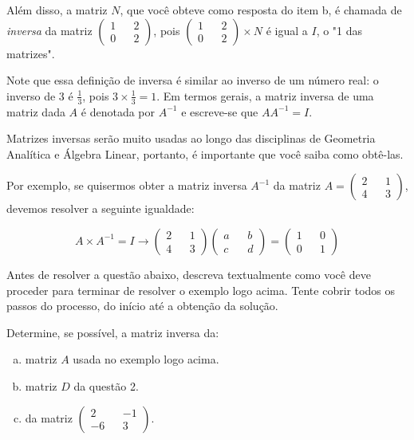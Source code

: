 \documentclass[main_estudante.tex]{subfiles}
\begin{document}
Além disso, a matriz $N$, que você obteve como resposta do item b, é chamada de {\em inversa} da matriz $ \begin{pmatrix} 1 && 2 \\ 0 && 2 \end{pmatrix}$, pois $\begin{pmatrix} 1 && 2 \\ 0 && 2 \end{pmatrix} \times N$ é igual a $I$, o "1 das matrizes".

Note que essa definição de inversa é similar ao inverso de um número real: o inverso de 3 é $\frac{1}{3}$, pois $3 \times \frac{1}{3} = 1$. Em termos gerais, a matriz inversa de uma matriz dada $A$ é denotada por $A^{-1}$ e escreve-se que $AA^{-1}=I$.

Matrizes inversas serão muito usadas ao longo das disciplinas de Geometria Analítica e Álgebra Linear, portanto, é importante que você saiba como obtê-las.

Por exemplo, se quisermos obter a matriz inversa $A^{-1}$ da matriz $A=\begin{pmatrix} 2 && 1 \\ 4 && 3 \end{pmatrix}$, devemos resolver a seguinte igualdade:


\begin{equation*}
 A \times A^{-1}=I \longrightarrow \begin{pmatrix} 2 && 1 \\ 4 && 3 \end{pmatrix} \begin{pmatrix} a && b \\ c && d \end{pmatrix} = \begin{pmatrix} 1 && 0 \\ 0 && 1 \end{pmatrix}
\end{equation*}

\begin{reflita}
Antes de resolver a questão abaixo, descreva textualmente como você deve proceder para terminar de resolver o exemplo logo acima. Tente cobrir todos os passos do processo, do início até a obtenção da solução.
\end{reflita}

\begin{questao}
Determine, se possível, a matriz inversa da:
\begin{enumerate}[a)]
\item matriz $A$ usada no exemplo logo acima.
\item matriz $D$ da questão 2.
\item da matriz $ \begin{pmatrix} 2 && -1 \\ -6 && 3 \end{pmatrix}$.
\end{enumerate}
\end{questao}
\end{document}
